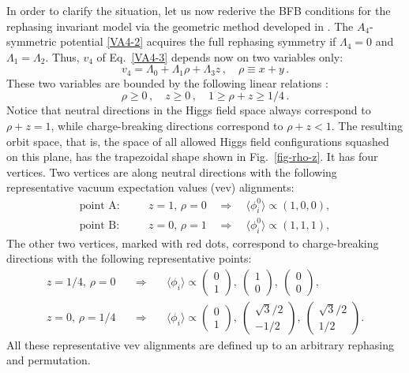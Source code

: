 \documentclass[11pt]{article}
\newcommand{\doublet}[2]{ \left( \begin{array}{c}#1 \\ #2 \end{array}\right) }
\newcommand{\lr}[1]{ \langle #1 \rangle}
\begin{document}
In order to clarify the situation, let us now rederive the BFB conditions for the rephasing invariant model
via the geometric method developed in \cite{Degee:2012sk}.
The $A_4$-symmetric potential \eqref{VA4-2} acquires the full rephasing symmetry if $\Lambda_4 = 0$ and $\Lambda_1=\Lambda_2$.
Thus, $v_4$ of Eq.~\eqref{VA4-3} depends now on two variables only:
\begin{equation}
v_4 = \Lambda_{0} + \Lambda_{1} \rho + \Lambda_3 z\,, \quad \rho \equiv x+y\,.\label{v4-U1U1}
\end{equation}
These two variables are bounded by the following linear relations \cite{Degee:2012sk,Ivanov:2010ww}:
\begin{equation}
\rho \ge 0\,, \quad z\ge 0\,,\quad 1 \ge \rho+z \ge 1/4\,.\label{relations-U1U1}
\end{equation}
Notice that neutral directions in the Higgs field space always correspond to $\rho + z = 1$, while charge-breaking directions
correspond to $\rho + z < 1$.
The resulting orbit space, that is, the space of all allowed Higgs field configurations squashed on this plane, 
has the trapezoidal shape shown in Fig.~\ref{fig-rho-z}.
It has four vertices. Two vertices are along neutral directions with the following representative vacuum expectation values (vev) alignments: 
\begin{eqnarray}
\mbox{point A:} &\quad& z=1,\, \rho = 0 \quad \Rightarrow \quad \lr{\phi_i^0} \propto (1, 0, 0),\nonumber\\
\mbox{point B:} &\quad& z=0,\, \rho = 1 \quad \Rightarrow \quad \lr{\phi_i^0} \propto (1, 1, 1),\label{minU1U1-AB}
\end{eqnarray}
The other two vertices, marked with red dots, correspond to charge-breaking directions with the following representative points:
\begin{eqnarray}
z=1/4,\, \rho = 0  \quad &\Rightarrow& \quad  \lr{\phi_i} \propto 
\doublet{0}{1},\ 
\doublet{1}{0},\
\doublet{0}{0},\nonumber\\[2mm]
z=0,\, \rho = 1/4  \quad &\Rightarrow&  \quad \lr{\phi_i} \propto 
\doublet{0}{1},\ 
\doublet{\sqrt{3}/2}{-1/2},\
\doublet{\sqrt{3}/2}{1/2}.
\label{minU1U1-charged}
\end{eqnarray}
All these representative vev alignments are defined up to an arbitrary rephasing and permutation.
\end{document}
